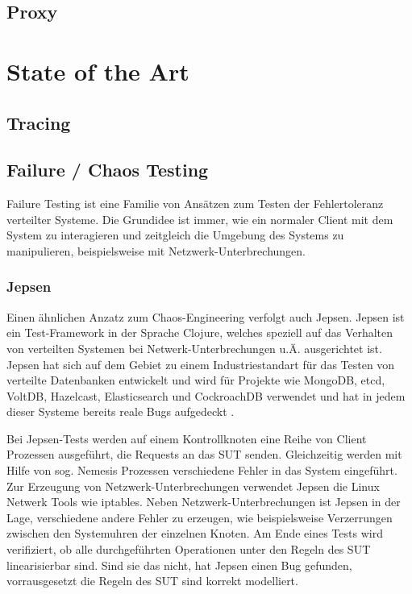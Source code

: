 \documentclass[12pt,a4paper]{report}
\begin{document}
\section{Proxy}

\chapter{State of the Art}
\cite{debugging_distributed_systems_2016}
\section{Tracing}
\section{Failure / Chaos Testing}
Failure Testing ist eine Familie von Ansätzen zum Testen der Fehlertoleranz verteilter Systeme. Die Grundidee ist immer, wie ein
normaler Client mit dem System zu interagieren und zeitgleich die Umgebung des Systems zu manipulieren, beispielsweise mit
Netzwerk-Unterbrechungen.
\cite{why_is_random_testing_effective}
\subsection{Jepsen}
Einen ähnlichen Anzatz zum Chaos-Engineering verfolgt auch Jepsen.
Jepsen ist ein Test-Framework in der Sprache Clojure, welches speziell auf das Verhalten von verteilten Systemen bei
Netwerk-Unterbrechungen u.Ä. ausgerichtet ist. Jepsen hat sich auf dem Gebiet zu einem Industriestandart für das Testen von
verteilte Datenbanken entwickelt \cite{abstracting_the_geniuses} und wird für Projekte wie MongoDB, etcd, VoltDB, Hazelcast,
Elasticsearch und CockroachDB verwendet und hat in jedem dieser Systeme bereits reale Bugs aufgedeckt \cite{jepsen_analyses}.

Bei Jepsen-Tests werden auf einem Kontrollknoten eine Reihe von Client Prozessen ausgeführt, die Requests an das SUT senden.
Gleichzeitig werden mit Hilfe von sog. Nemesis Prozessen verschiedene Fehler in das System eingeführt. Zur Erzeugung von
Netzwerk-Unterbrechungen verwendet Jepsen die Linux Netwerk Tools wie iptables. Neben Netzwerk-Unterbrechungen ist Jepsen in
der Lage, verschiedene andere Fehler zu erzeugen, wie beispielsweise Verzerrungen zwischen den Systemuhren der einzelnen Knoten.
Am Ende eines Tests wird verifiziert, ob alle durchgeführten Operationen unter den Regeln des SUT linearisierbar sind. Sind sie das
nicht, hat Jepsen einen Bug gefunden, vorrausgesetzt die Regeln des SUT sind korrekt modelliert.
\end{document}
